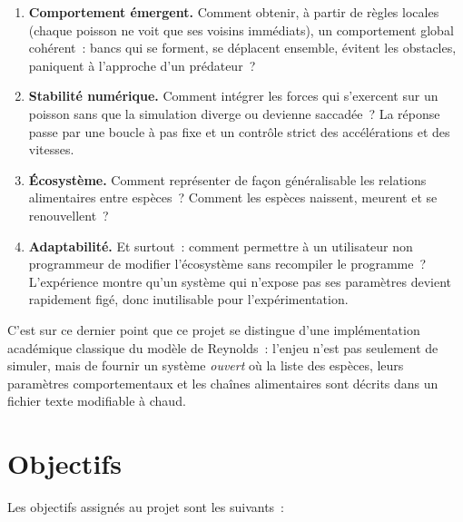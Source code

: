 \begin{enumerate}[leftmargin=*]
  \item \textbf{Comportement émergent.} Comment obtenir, à partir de
    règles locales (chaque poisson ne voit que ses voisins immédiats),
    un comportement global cohérent~: bancs qui se forment, se
    déplacent ensemble, évitent les obstacles, paniquent à l'approche
    d'un prédateur~?

  \item \textbf{Stabilité numérique.} Comment intégrer les forces qui
    s'exercent sur un poisson sans que la simulation diverge ou
    devienne saccadée~? La réponse passe par une boucle à pas fixe
    et un contrôle strict des accélérations et des vitesses.

  \item \textbf{Écosystème.} Comment représenter de façon généralisable
    les relations alimentaires entre espèces~? Comment les espèces
    naissent, meurent et se renouvellent~?

  \item \textbf{Adaptabilité.} Et surtout~: comment permettre à un
    utilisateur non programmeur de modifier l'écosystème sans
    recompiler le programme~? L'expérience montre qu'un système qui
    n'expose pas ses paramètres devient rapidement figé, donc
    inutilisable pour l'expérimentation.
\end{enumerate}

C'est sur ce dernier point que ce projet se distingue d'une
implémentation académique classique du modèle de Reynolds~: l'enjeu
n'est pas seulement de simuler, mais de fournir un système
\emph{ouvert} où la liste des espèces, leurs paramètres
comportementaux et les chaînes alimentaires sont décrits dans un
fichier texte modifiable à chaud.

\section{Objectifs}

Les objectifs assignés au projet sont les suivants~:

